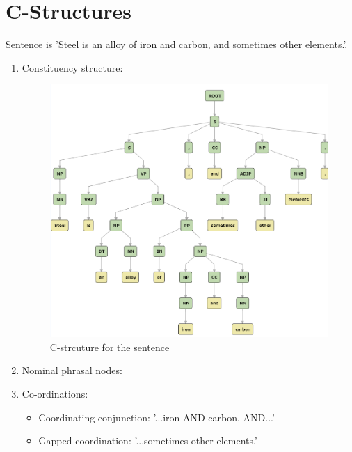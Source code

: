 \documentclass{article}
\begin{document}
\section{C-Structures}
Sentence is 'Steel is an alloy of iron and carbon, and sometimes other
elements.'.
\begin{enumerate}
  \item Constituency structure:
  \begin{figure}
    \includegraphics[width=\linewidth]{task2img.png}
    \caption{C-strcuture for the sentence}
    \label{Cstruct}
  \end{figure}
  \item Nominal phrasal nodes:
  \item Co-ordinations:
  \begin{itemize}
    \item Coordinating conjunction: '...iron AND carbon, AND...'
    \item Gapped coordination: '...sometimes other elements.'
  \end{itemize}
\end{enumerate}
\end{document}
